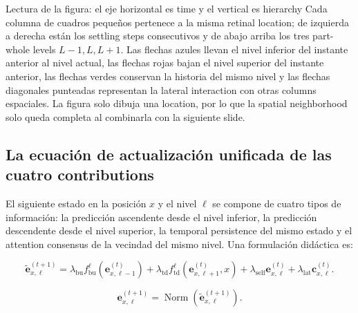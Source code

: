 
\begin{knowledgebox}{Lectura de la figura: el eje horizontal es time y el vertical es hierarchy}
Cada columna de cuadros pequeños pertenece a la misma retinal location; de izquierda a derecha están los settling steps consecutivos y de abajo arriba los tres part-whole levels $L-1,L,L+1$. Las flechas azules llevan el nivel inferior del instante anterior al nivel actual, las flechas rojas bajan el nivel superior del instante anterior, las flechas verdes conservan la historia del mismo nivel y las flechas diagonales punteadas representan la lateral interaction con otras columns espaciales. La figura solo dibuja una location, por lo que la spatial neighborhood solo queda completa al combinarla con la siguiente slide.
\end{knowledgebox}


\subsection{La ecuación de actualización unificada de las cuatro contributions}

El siguiente estado en la posición $x$ y el nivel $\ell$ se compone de cuatro tipos de información: la predicción ascendente desde el nivel inferior, la predicción descendente desde el nivel superior, la temporal persistence del mismo estado y el attention consensus de la vecindad del mismo nivel. Una formulación didáctica es:

\[
\tilde{\mathbf e}_{x,\ell}^{(t+1)}=
\lambda_{\mathrm{bu}} f_{\mathrm{bu}}^{\ell}\!\left(\mathbf e_{x,\ell-1}^{(t)}\right)
+\lambda_{\mathrm{td}} f_{\mathrm{td}}^{\ell}\!\left(\mathbf e_{x,\ell+1}^{(t)},x\right)
+\lambda_{\mathrm{self}}\mathbf e_{x,\ell}^{(t)}
+\lambda_{\mathrm{lat}}\mathbf c_{x,\ell}^{(t)}.
\]

\[
\mathbf e_{x,\ell}^{(t+1)}=\operatorname{Norm}\!\left(\tilde{\mathbf e}_{x,\ell}^{(t+1)}\right).
\]

